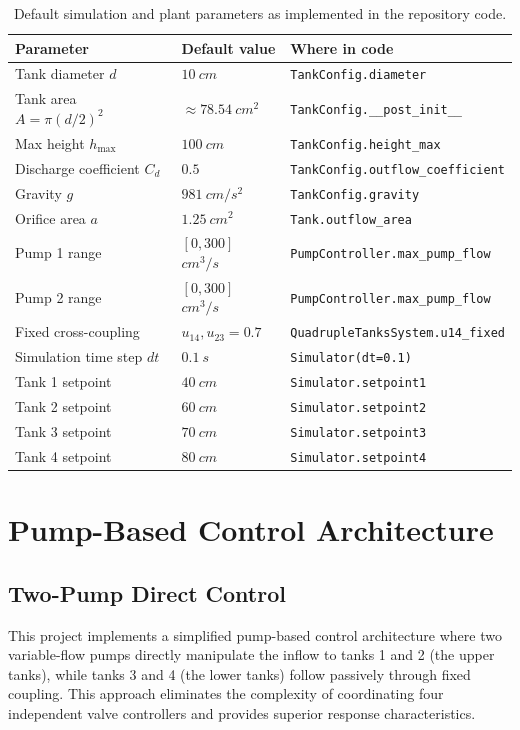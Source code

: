\documentclass[11pt]{article}
\begin{document}
\begin{table}[H]
  \centering
  \caption{Default simulation and plant parameters as implemented in the repository code.}
  \label{tab:defaults}
  \small
  \setlength{\tabcolsep}{6pt}
  \begin{tabular}{@{}p{}p{}p{}@{}}
    \toprule
    Parameter & Default value & Where in code \\ \midrule
    Tank diameter \(d\) & \(\SI{10}{cm}\) & \texttt{TankConfig.diameter} \\
    Tank area \(A=\pi(d/2)^2\) & \(\approx \SI{78.54}{cm^2}\) & \texttt{TankConfig.\_\_post\_init\_\_} \\
    Max height \(h_{\max}\) & \(\SI{100}{cm}\) & \texttt{TankConfig.height\_max} \\
    Discharge coefficient \(C_d\) & \(0.5\) & \texttt{TankConfig.outflow\_coefficient} \\
    Gravity \(g\) & \(\SI{981}{cm/s^2}\) & \texttt{TankConfig.gravity} \\
    Orifice area \(a\) & \(\SI{1.25}{cm^2}\) & \texttt{Tank.outflow\_area} \\
    Pump 1 range & \([0, 300]\) \(\si{cm^3/s}\) & \texttt{PumpController.max\_pump\_flow} \\
    Pump 2 range & \([0, 300]\) \(\si{cm^3/s}\) & \texttt{PumpController.max\_pump\_flow} \\
    Fixed cross-coupling & \(u_{14}, u_{23} = 0.7\) & \texttt{QuadrupleTanksSystem.u14\_fixed} \\
    Simulation time step \(dt\) & \(\SI{0.1}{s}\) & \texttt{Simulator(dt=0.1)} \\
    Tank 1 setpoint & \(\SI{40}{cm}\) & \texttt{Simulator.setpoint1} \\
    Tank 2 setpoint & \(\SI{60}{cm}\) & \texttt{Simulator.setpoint2} \\
    Tank 3 setpoint & \(\SI{70}{cm}\) & \texttt{Simulator.setpoint3} \\
    Tank 4 setpoint & \(\SI{80}{cm}\) & \texttt{Simulator.setpoint4} \\
    \bottomrule
  \end{tabular}
\end{table}

\section{Pump-Based Control Architecture}
\subsection{Two-Pump Direct Control}
This project implements a simplified pump-based control architecture where two variable-flow pumps directly manipulate the inflow to tanks 1 and 2 (the upper tanks), while tanks 3 and 4 (the lower tanks) follow passively through fixed coupling. This approach eliminates the complexity of coordinating four independent valve controllers and provides superior response characteristics.
\end{document}
